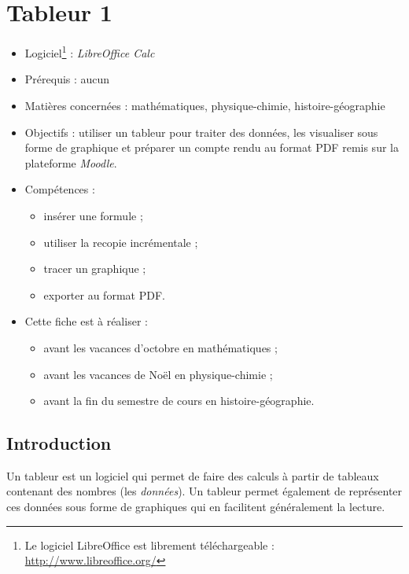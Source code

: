 \chapter{Tableur 1}\label{ficheTableur1}  

\begin{itemize}
\item Logiciel\footnote{Le logiciel LibreOffice est librement téléchargeable : \url{http://www.libreoffice.org/}} : \emph{LibreOffice Calc}
\item Prérequis : aucun
\item Matières concernées : mathématiques, physique-chimie, histoire-géographie
\item Objectifs : utiliser un tableur pour traiter des données, les visualiser sous forme de graphique et préparer un compte rendu au format PDF remis sur la plateforme \emph{Moodle}.
\item Compétences : 
        \begin{itemize}
        \item insérer une formule ;
        \item utiliser la recopie incrémentale ;
        \item tracer un graphique ;
        \item exporter au format PDF.
        \end{itemize}
\item Cette fiche est à réaliser :
        \begin{itemize}
        \item avant les vacances d'octobre en mathématiques ;
        \item avant les vacances de Noël en physique-chimie ;
        \item avant la fin du semestre de cours en histoire-géographie. 
        \end{itemize}
\end{itemize}


\section{Introduction} 

Un tableur est un logiciel qui permet de faire des calculs à partir de tableaux contenant des nombres (les \emph{données}). Un tableur permet également de représenter ces données sous forme de graphiques qui en facilitent généralement la lecture.

